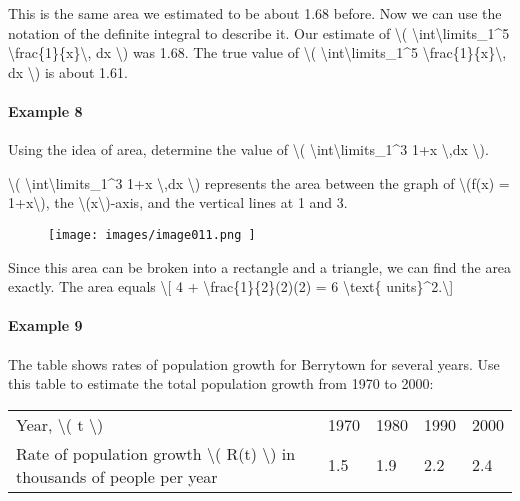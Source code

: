 This is the same area we estimated to be about 1.68 before. Now we can
use the notation of the definite integral to describe it. Our estimate
of \textbackslash{}( \textbackslash{}int\textbackslash{}limits\_1\^{}5
\textbackslash{}frac\{1\}\{x\}\textbackslash{}, dx \textbackslash{}) was
1.68. The true value of \textbackslash{}(
\textbackslash{}int\textbackslash{}limits\_1\^{}5
\textbackslash{}frac\{1\}\{x\}\textbackslash{}, dx \textbackslash{}) is
about 1.61.

\hypertarget{example-8}{%
\paragraph{Example 8}\label{example-8}}

Using the idea of area, determine the value of \textbackslash{}(
\textbackslash{}int\textbackslash{}limits\_1\^{}3 1+x
\textbackslash{},dx \textbackslash{}).

\textbackslash{}( \textbackslash{}int\textbackslash{}limits\_1\^{}3 1+x
\textbackslash{},dx \textbackslash{}) represents the area between the
graph of \textbackslash{}(f(x) = 1+x\textbackslash{}), the
\textbackslash{}(x\textbackslash{})-axis, and the vertical lines at 1
and 3.

\begin{figure}
\centering
\texttt{[image: images/image011.png
]}
\caption{}
\end{figure}

Since this area can be broken into a rectangle and a triangle, we can
find the area exactly. The area equals \textbackslash{}{[} 4 +
\textbackslash{}frac\{1\}\{2\}(2)(2) = 6 \textbackslash{}text\{
units\}\^{}2.\textbackslash{}{]}

\hypertarget{example-9}{%
\paragraph{Example 9}\label{example-9}}

The table shows rates of population growth for Berrytown for several
years. Use this table to estimate the total population growth from 1970
to 2000:

\begin{longtable}[]{@{}lllll@{}}
\toprule
\endhead
Year, \textbackslash{}( t \textbackslash{}) & 1970 & 1980 & 1990 &
2000\tabularnewline
Rate of population growth \textbackslash{}( R(t) \textbackslash{}) in
thousands of people per year & 1.5 & 1.9 & 2.2 & 2.4\tabularnewline
\bottomrule
\end{longtable}

